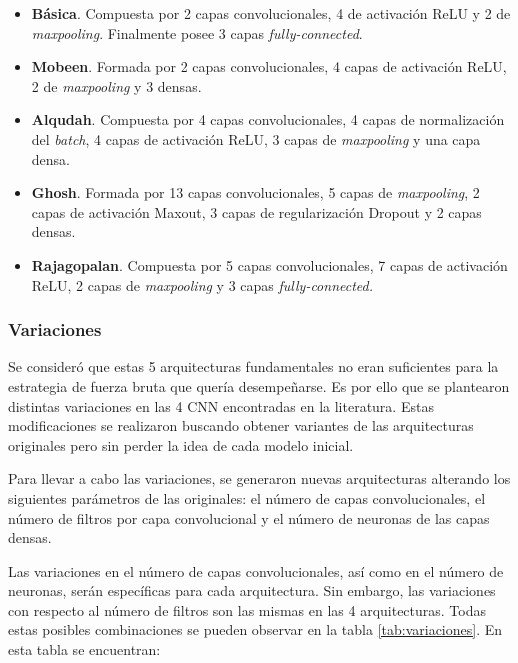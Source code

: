 \begin{itemize}[itemsep=0.25em]

    \item \textbf{Básica}. Compuesta por 2 capas convolucionales, 4 de activación ReLU y 2 de \textit{maxpooling}. Finalmente posee 3 capas \textit{fully-connected}.

    \item \textbf{Mobeen}. Formada por 2 capas convolucionales, 4 capas de activación ReLU, 2 de \textit{maxpooling} y 3 densas.

    \item \textbf{Alqudah}. Compuesta por 4 capas convolucionales, 4 capas de normalización del \textit{batch}, 4 capas de activación ReLU, 3 capas de \textit{maxpooling} y una capa densa.
    
    \item \textbf{Ghosh}. Formada por 13 capas convolucionales, 5 capas de \textit{maxpooling}, 2 capas de activación Maxout, 3 capas de regularización Dropout y 2 capas densas. 
    
    \item \textbf{Rajagopalan}. Compuesta por 5 capas convolucionales, 7 capas de activación ReLU, 2 capas de \textit{maxpooling} y 3 capas \textit{fully-connected.}
\end{itemize}

\subsubsection{Variaciones}

Se consideró que estas 5 arquitecturas fundamentales no eran suficientes para la estrategia de fuerza bruta que quería desempeñarse. Es por ello que se plantearon distintas variaciones en las 4 CNN encontradas en la literatura. Estas modificaciones se realizaron buscando obtener variantes de las arquitecturas originales pero sin perder la idea de cada modelo inicial.

Para llevar a cabo las variaciones, se generaron nuevas arquitecturas alterando los siguientes parámetros de las originales: el número de capas convolucionales, el número de filtros por capa convolucional y el número de neuronas de las capas densas. 

Las variaciones en el número de capas convolucionales, así como en el número de neuronas, serán específicas para cada arquitectura. Sin embargo, las variaciones con respecto al número de filtros son las mismas en las 4 arquitecturas. Todas estas posibles combinaciones se pueden observar en la tabla \ref{tab:variaciones}. En esta tabla se encuentran: 

